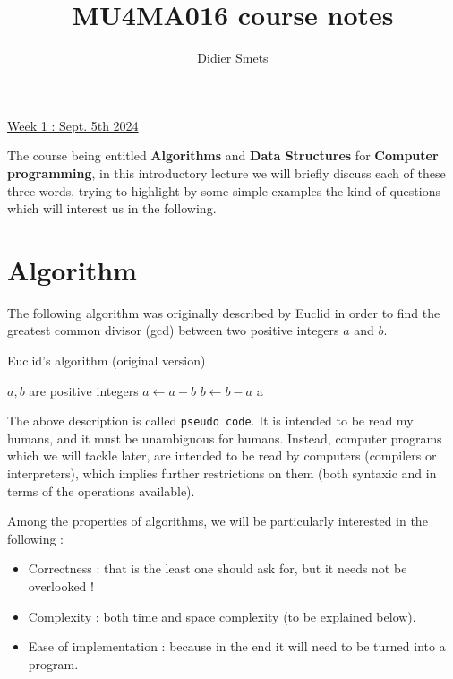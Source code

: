 \documentclass[12pt]{article}
\title{MU4MA016 course notes}
\author{Didier Smets}
\theoremstyle{plain}
\theoremstyle{remark}
\begin{document}
\maketitle

\noindent \underline{{\sc Week 1 : Sept. 5th 2024}}

\bigskip

The course being entitled {\bf Algorithms} and {\bf Data Structures} for {\bf
Computer programming}, in this introductory lecture we will briefly discuss each 
of these three words, trying to highlight by some simple examples the kind of
questions which will interest us in the following.

\section{Algorithm}

The following algorithm was originally described by Euclid in order to find
the greatest common divisor (gcd) between two positive integers $a$ and $b$.

\begin{algorithm}[H]
\caption{Euclid's algorithm (original version)}
\begin{algorithmic}
\Require $a, b$ are positive integers
\State $a \gets a - b$
\Else{}
\State $b \gets b - a$
\EndIf
\EndWhile
\State \Return a
\EndFunction
\end{algorithmic}
\end{algorithm}

The above description is called {\tt pseudo code}. It is intended to be read my
humans, and it must be unambiguous for humans. Instead, computer programs which
we will tackle later, are intended to be read by computers (compilers or
interpreters), which implies further restrictions on them (both syntaxic and
in terms of the operations available). 

Among the properties of algorithms, we will be particularly interested in the
following :
\begin{itemize}
\item Correctness : that is the least one should ask for, but it needs not be overlooked !
\item Complexity : both time and space complexity (to be explained below).
\item Ease of implementation : because in the end it will need to be turned
into a program.
\end{itemize}
\end{document}

